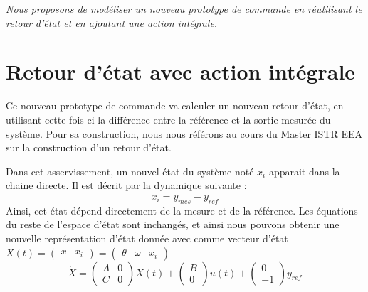 \begin{center}
\textit{Nous proposons de modéliser un nouveau prototype de commande en réutilisant le retour d'état et en ajoutant une action intégrale.}
\end{center}
\section{Retour d'état avec action intégrale}
		Ce nouveau prototype de commande va calculer un nouveau retour d'état, en utilisant cette fois ci la différence entre la référence et la sortie mesurée du système. Pour sa construction, nous nous référons au cours du Master ISTR EEA sur la construction d'un retour d'état. 

		
Dans cet asservissement, un nouvel état du système noté $x_i$ apparait dans la chaine directe. Il est décrit par la dynamique suivante :
		\begin{equation}\label{eqn:dynamique_Xi}
		\dot{x}_i = y_{mes} - y_{ref}
		\end{equation}
		Ainsi, cet état dépend directement de la mesure et de la référence. Les équations du reste de l'espace d'état sont inchangés, et ainsi nous pouvons obtenir une nouvelle représentation d'état donnée avec comme vecteur d'état $X(t) = \begin{pmatrix}
		x & x_i
		\end{pmatrix} = \begin{pmatrix}
		\theta & \omega & x_i
		\end{pmatrix}$
\begin{equation}\label{eqn:EERetourIntegral}
\dot{X} = \begin{pmatrix}
A&0 \\ C& 0
\end{pmatrix}X(t) + \begin{pmatrix}
B \\ 0
\end{pmatrix}u(t) + \begin{pmatrix}
0 \\ -1
\end{pmatrix}y_{ref}
\end{equation}		
		
